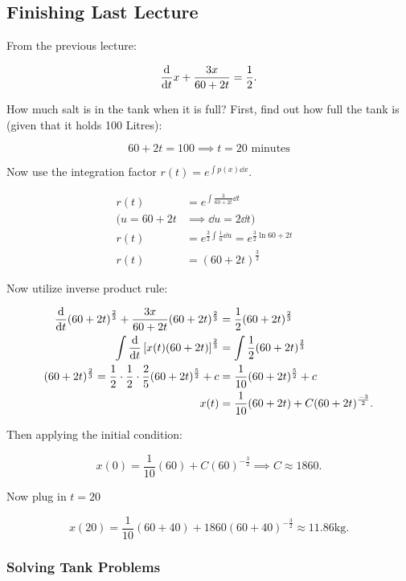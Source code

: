 \documentclass[../notes.tex]{subfiles}
\begin{document}
\subsection{Finishing Last Lecture}
From the previous lecture:

\[
				\dv{t} x + \frac{3x}{60+2t} = \frac{1}{2}
.\]

How much salt is in the tank when it is full? First, find out how full the tank is (given that it holds 100 Litres):

\begin{equation*}
				60 + 2t = 100 \implies t=20 \text{ minutes}
\end{equation*}

Now use the integration factor $r(t)=e^{\int p(x) \dd x}$.

\begin{align*}
				r(t) &= e^{\int \frac{3}{60+2t} \dd t} & \\
				(u = 60 + 2t &\implies \dd u = 2 \dd t) \\
				r(t) &= e^{ \frac{3}{2} \int \frac{1}{u} \dd u} = e^{\frac{3}{2} \ln{60 + 2t}} \\
				r(t) &= (60+2t)^{\frac{3}{2}}
\end{align*}

Now utilize inverse product rule:

\begin{align*}
				\dv{t} (60+2t)^{\frac{2}{3}} + \frac{3x}{60+2t} (60+2t)^{\frac{2}{3}} &= \frac{1}{2} (60+2t)^{\frac{2}{3}} \\
				\int \dv{t} \left[ x(t) (60+2t) \right] ^{\frac{2}{3}} &= \int \frac{1}{2} (60+2t)^{\frac{2}{3}} \\
				(60+2t)^{\frac{2}{3}} = \frac{1}{2} \cdot \frac{1}{2} \cdot \frac{2}{5} (60+2t)^{\frac{5}{2}} + c &= \frac{1}{10} (60+2t)^{\frac{5}{2}} + c \\
				x(t) &= \frac{1}{10} (60+2t) + C(60+2t)^{\frac{-3}{2}}
.\end{align*}

Then applying the initial condition:

\[
				x(0) = \frac{1}{10} (60) + C(60)^{-\frac{3}{2}} \implies \boxed{C \approx 1860.}\]

Now plug in $t=20$

\[
				x(20) = \frac{1}{10}(60+40) + 1860(60 + 40)^{-\frac{3}{2}} \approx \boxed{11.86 \text{kg}.}\]

\subsubsection{Solving Tank Problems}
\label{sec:tankproblems}
\end{document}
